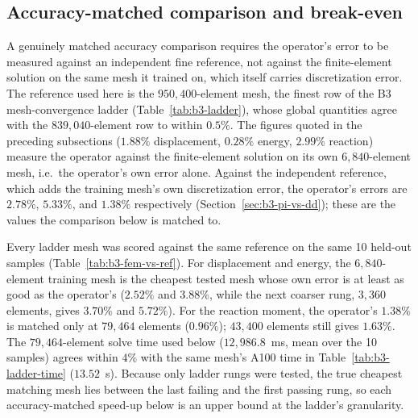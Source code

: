 \documentclass[final,5p,times]{elsarticle}
\begin{document}
\subsection{Accuracy-matched comparison and break-even}
\label{sec:b3-breakeven}
A genuinely matched accuracy comparison requires the operator's error to
be measured against an independent fine reference, not against the
finite-element solution on the same mesh it trained on, which itself
carries discretization error. The reference used here is the
$950{,}400$-element mesh, the finest row of the B3 mesh-convergence
ladder (Table~\ref{tab:b3-ladder}), whose global quantities agree with
the $839{,}040$-element row to within $0.5\%$. The figures quoted in the
preceding subsections ($1.88\%$ displacement, $0.28\%$ energy, $2.99\%$
reaction) measure the operator against the finite-element solution on
its own $6{,}840$-element mesh, i.e.\ the operator's own error alone.
Against the independent reference, which adds the training mesh's own
discretization error, the operator's errors are $2.78\%$, $5.33\%$, and
$1.38\%$ respectively (Section~\ref{sec:b3-pi-vs-dd}); these are the
values the comparison below is matched to.

Every ladder mesh was scored against the same reference on the same 10
held-out samples (Table~\ref{tab:b3-fem-vs-ref}). For displacement and
energy, the $6{,}840$-element training mesh is the cheapest tested mesh
whose own error is at least as good as the operator's ($2.52\%$ and
$3.88\%$, while the next coarser rung, $3{,}360$ elements, gives
$3.70\%$ and $5.72\%$). For the reaction moment, the operator's $1.38\%$
is matched only at $79{,}464$ elements ($0.96\%$); $43{,}400$ elements
still gives $1.63\%$. The $79{,}464$-element solve time used below
($12{,}986.8$~ms, mean over the 10 samples) agrees within $4\%$ with the
same mesh's A100 time in Table~\ref{tab:b3-ladder-time} ($13.52$~s). Because only ladder rungs were tested, the true
cheapest matching mesh lies between the last failing and the first
passing rung, so each accuracy-matched speed-up below is an upper bound
at the ladder's granularity.
\end{document}
